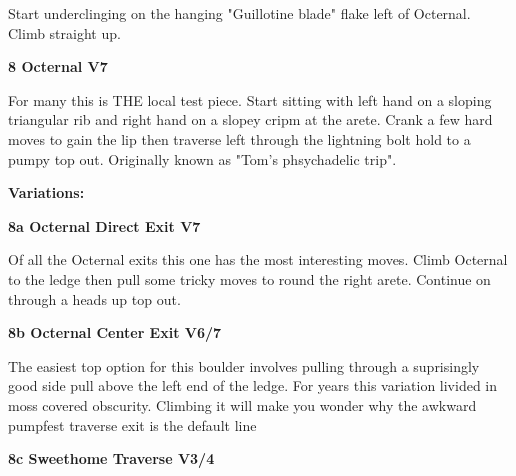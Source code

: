 \begin{multicols}{2}
\begin{minipage}{\linewidth}
					\begin{adjustwidth}{0.5cm}{}				
					Start underclinging on the hanging "Guillotine blade" flake left of Octernal. Climb straight up.
					\end{adjustwidth}
					\end{minipage}
					\begin{minipage}{\linewidth}	
					\label{rt:Octernal}
\colorbox{Goldenrod!50}{
\parbox{0.95\textwidth}{
\textbf{
8 Octernal V7     
}
}
}

					\begin{adjustwidth}{0.5cm}{}				
					For many this is THE local test piece. Start sitting with left hand on a sloping triangular rib and right hand on a slopey cripm at the arete. Crank a few hard moves to gain the lip then traverse left through the lightning bolt hold to a pumpy top out. Originally known as "Tom's phsychadelic trip".
					\end{adjustwidth}
					\end{minipage}
						\begin{adjustwidth}{0.5cm}{}				
						\textbf{Variations:} \newline
							\begin{minipage}{\linewidth}	
							\label{vr:Octernal Direct Exit}
\colorbox{Goldenrod!50}{
\parbox{0.95\textwidth}{
\textbf{
8a Octernal Direct Exit V7     
}
}
}

							\begin{adjustwidth}{0.5cm}{}				
							Of all the Octernal exits this one has the most interesting moves. Climb Octernal to the ledge then pull some tricky moves to round the right arete. Continue on through a heads up top out.
							\end{adjustwidth}
							\end{minipage}
							\begin{minipage}{\linewidth}	
							\label{vr:Octernal Center Exit}
\colorbox{Goldenrod!50}{
\parbox{0.95\textwidth}{
\textbf{
8b Octernal Center Exit V6/7    
}
}
}

							\begin{adjustwidth}{0.5cm}{}				
							The easiest top option for this boulder involves pulling through a suprisingly good side pull above the left end of the ledge. For years this variation livided in moss covered obscurity. Climbing it will make you wonder why the awkward pumpfest traverse exit is the default line
							\end{adjustwidth}
							\end{minipage}
							\begin{minipage}{\linewidth}	
							\label{vr:Sweethome Traverse}
\colorbox{RoyalBlue!20}{
\parbox{0.95\textwidth}{
\textbf{
8c Sweethome Traverse V3/4    
}
}
}


\end{minipage}
\end{adjustwidth}
\end{multicols}
